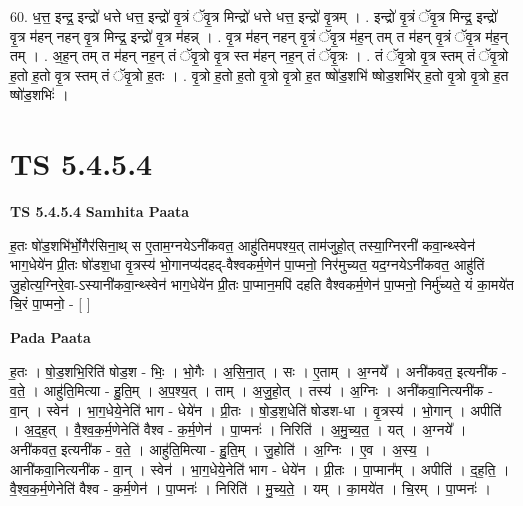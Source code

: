 \documentclass[17pt]{extarticle}
\begin{document}
60. ध॒त्त॒ इन्द्र॒ इन्द्रो॑ धत्ते धत्त॒ इन्द्रो॑ वृ॒त्रं ॅवृ॒त्र मिन्द्रो॑ धत्ते धत्त॒ इन्द्रो॑ वृ॒त्रम् । . इन्द्रो॑ वृ॒त्रं ॅवृ॒त्र मिन्द्र॒ इन्द्रो॑ वृ॒त्र म॑हन् नहन् वृ॒त्र मिन्द्र॒ इन्द्रो॑ वृ॒त्र म॑हन्न् । . वृ॒त्र म॑हन् नहन् वृ॒त्रं ॅवृ॒त्र म॑ह॒न् तम् त म॑हन् वृ॒त्रं ॅवृ॒त्र म॑ह॒न् तम् । . अ॒ह॒न् तम् त म॑हन् नह॒न् तं ॅवृ॒त्रो वृ॒त्र स्त म॑हन् नह॒न् तं ॅवृ॒त्रः । . तं ॅवृ॒त्रो वृ॒त्र स्तम् तं ॅवृ॒त्रो ह॒तो ह॒तो वृ॒त्र स्तम् तं ॅवृ॒त्रो ह॒तः । . वृ॒त्रो ह॒तो ह॒तो वृ॒त्रो वृ॒त्रो ह॒त ष्षो॑ड॒शभि॑ ष्षोड॒शभि॑र् ह॒तो वृ॒त्रो वृ॒त्रो ह॒त ष्षो॑ड॒शभिः॑ । \newline
\pagebreak
{}

\section{ TS 5.4.5.4 }

\textbf{TS 5.4.5.4 } \newline
\textbf{Samhita Paata} \newline

ह॒तः षो॑ड॒शभि॑र्भो॒गैर॑सिना॒थ् स ए॒ताम॒ग्नयेऽनी॑कवत॒ आहु॑तिमपश्य॒त् ताम॑जुहो॒त् तस्या॒ग्निरनी॑ कवा॒न्थ्स्वेन॑ भाग॒धेये॑न प्री॒तः षो॑डश॒धा वृ॒त्रस्य॑ भो॒गानप्य॑दहद्-वैश्वकर्म॒णेन॑ पा॒प्मनो॒ निर॑मुच्यत॒ यद॒ग्नयेऽनी॑कवत॒ आहु॑तिं जु॒होत्य॒ग्निरे॒वा-ऽस्यानी॑कवा॒न्थ्स्वेन॑ भाग॒धेये॑न प्री॒तः पा॒प्मान॒मपि॑ दहति वैश्वकर्म॒णेन॑ पा॒प्मनो॒ निर्मु॑च्यते॒ यं का॒मये॑त चि॒रं पा॒प्मनो॒ - [  ] \newline

\textbf{Pada Paata} \newline

ह॒तः । षो॒ड॒शभि॒रिति॑ षोड॒श - भिः॒ । भो॒गैः । अ॒सि॒ना॒त् । सः । ए॒ताम् । अ॒ग्नये᳚ । अनी॑कवत॒ इत्यनी॑क - व॒ते॒ । आहु॑ति॒मित्या - हु॒ति॒म् । अ॒प॒श्य॒त् । ताम् । अ॒जु॒हो॒त् । तस्य॑ । अ॒ग्निः । अनी॑कवा॒नित्यनी॑क - वा॒न् । स्वेन॑ । भा॒ग॒धेये॒नेति॑ भाग - धेये॑न । प्री॒तः । षो॒ड॒श॒धेति॑ षोडश-धा । वृ॒त्रस्य॑ । भो॒गान् । अपीति॑ । अ॒द॒ह॒त् । वै॒श्व॒क॒र्म॒णेनेति॑ वैश्व - क॒र्म॒णेन॑ । पा॒प्मनः॑ । निरिति॑ । अ॒मु॒च्य॒त॒ । यत् । अ॒ग्नये᳚ । अनी॑कवत॒ इत्यनी॑क - व॒ते॒ । आहु॑ति॒मित्या - हु॒ति॒म् । जु॒होति॑ । अ॒ग्निः । ए॒व । अ॒स्य॒ । आनी॑कवा॒नित्यनी॑क - वा॒न् । स्वेन॑ । भा॒ग॒धेये॒नेति॑ भाग - धेये॑न । प्री॒तः । पा॒प्मान᳚म् । अपीति॑ । द॒ह॒ति॒ । वै॒श्व॒क॒र्म॒णेनेति॑ वैश्व - क॒र्म॒णेन॑ । पा॒प्मनः॑ । निरिति॑ । मु॒च्य॒ते॒ । यम् । का॒मये॑त । चि॒रम् । पा॒प्मनः॑ ।  \newline
\end{document}
